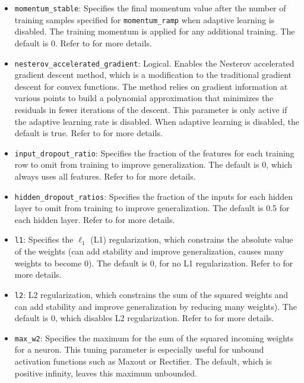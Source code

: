 {{{\begin{itemize}
\item \texttt{momentum\_stable}: Specifies the final momentum value after the number of training samples specified for \texttt{momentum\_ramp} when adaptive learning is disabled. The training momentum is applied for any additional training. The default is 0.  Refer to {\textbf{}} for more details.

\item \texttt{nesterov\_accelerated\_gradient}:  Logical.  Enables the Nesterov accelerated gradient descent method, which is a modification to the traditional gradient descent for convex functions. The method relies on gradient information at various points to build a polynomial approximation that minimizes the residuals in fewer iterations of the descent. This parameter is only active if the adaptive learning rate is disabled.  When adaptive learning is disabled, the default is true. Refer to {\textbf{}} for more details.

\item \texttt{input\_dropout\_ratio}: Specifies the fraction of the features for each training row to omit from training to improve generalization. The default is 0, which always uses all features.  Refer to {\textbf{}} for more details.

\item \texttt{hidden\_dropout\_ratios}:  Specifies the fraction of the inputs for each hidden layer to omit from training to improve generalization. The default is 0.5 for each hidden layer.  Refer to {\textbf{}} for more details.

\item \texttt{l1}: Specifies the $\ell_1$ (L1) regularization, which constrains the absolute value of the weights (can add stability and improve generalization, causes many weights to become 0). The default is 0, for no L1 regularization. Refer to {\textbf{}} for more details.

\item \texttt{l2}: L2 regularization, which constrains the sum of the squared weights and can add stability and improve generalization by reducing many weights). The default is 0, which disables L2 regularization. Refer to {\textbf{}} for more details.

\item \texttt{max\_w2}: Specifies the maximum for the sum of the squared incoming weights for a neuron. This tuning parameter is especially useful for unbound activation functions such as Maxout or Rectifier. The default, which is positive infinity, leaves this maximum unbounded.


\end{itemize}}}}
